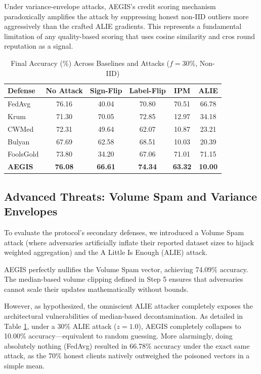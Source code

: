 \documentclass[10pt, conference]{IEEEtran}
\begin{document}
Under variance-envelope attacks, AEGIS's credit scoring mechanism paradoxically amplifies the attack by suppressing honest non-IID outliers more aggressively than the crafted ALIE gradients. This represents a fundamental limitation of any quality-based scoring that uses cosine similarity and cros round reputation as a signal.

\begin{table}[htbp]
\centering
\caption{Final Accuracy (\%) Across Baselines and Attacks ($f=30\%$, Non-IID)}
\begin{tabular}{@{}lccccc@{}}
\toprule
\textbf{Defense} & \textbf{No Attack} & \textbf{Sign-Flip} & \textbf{Label-Flip} & \textbf{IPM} & \textbf{ALIE} \\ \midrule
FedAvg & 76.16 & 40.04 & 70.80 & 70.51 & 66.78 \\
Krum & 71.30 & 70.05 & 72.85 & 12.97 & 34.18 \\
CWMed & 72.31 & 49.64 & 62.07 & 10.87 & 23.21 \\
Bulyan & 67.69 & 62.58 & 68.51 & 10.03 & 20.39 \\
FoolsGold & 73.80 & 34.20 & 67.06 & 71.01 & 71.15 \\
\textbf{AEGIS} & \textbf{76.08} & \textbf{66.61} & \textbf{74.34} & \textbf{63.32} & \textbf{10.00} \\ \bottomrule
\end{tabular}
\label{tab:comparison}
\end{table}

\subsection{Advanced Threats: Volume Spam and Variance Envelopes}
To evaluate the protocol's secondary defenses, we introduced a Volume Spam attack (where adversaries artificially inflate their reported dataset sizes to hijack weighted aggregation) and the A Little Is Enough (ALIE) attack. 

AEGIS perfectly nullifies the Volume Spam vector, achieving 74.09\% accuracy. The median-based volume clipping defined in Step 5 ensures that adversaries cannot scale their updates mathematically without bounds. 

However, as hypothesized, the omniscient ALIE attacker completely exposes the architectural vulnerabilities of median-based decontamination. As detailed in Table \ref{tab:comparison}, under a 30\% ALIE attack ($z=1.0$), AEGIS completely collapses to 10.00\% accuracy—equivalent to random guessing. More alarmingly, doing absolutely nothing (FedAvg) resulted in 66.78\% accuracy under the exact same attack, as the 70\% honest clients natively outweighed the poisoned vectors in a simple mean. 
\end{document}
